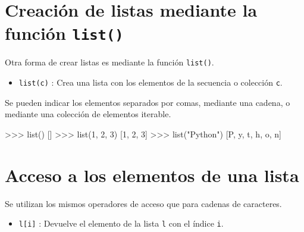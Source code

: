 \documentclass[
  spanish,
  a4paper,
]{scrreport}
\newenvironment{Shaded}{\begin{snugshade}}{\end{snugshade}}
\newcommand{\BuiltInTok}[1]{\textcolor[rgb]{0.00,0.23,0.31}{#1}}
\newcommand{\DecValTok}[1]{\textcolor[rgb]{0.68,0.00,0.00}{#1}}
\newcommand{\NormalTok}[1]{\textcolor[rgb]{0.00,0.23,0.31}{#1}}
\newcommand{\OperatorTok}[1]{\textcolor[rgb]{0.37,0.37,0.37}{#1}}
\newcommand{\StringTok}[1]{\textcolor[rgb]{0.13,0.47,0.30}{#1}}
\providecommand{\tightlist}{%
  \setlength{\itemsep}{0pt}\setlength{\parskip}{0pt}}
\begin{document}
\section{\texorpdfstring{Creación de listas mediante la función
\texttt{list()}}{Creación de listas mediante la función list()}}\label{creaciuxf3n-de-listas-mediante-la-funciuxf3n-list}

Otra forma de crear listas es mediante la función \texttt{list()}.

\begin{itemize}
\tightlist
\item
  \texttt{list(c)} : Crea una lista con los elementos de la secuencia o
  colección \texttt{c}.
\end{itemize}

Se pueden indicar los elementos separados por comas, mediante una
cadena, o mediante una colección de elementos iterable.

\begin{Shaded}
\begin{Highlighting}[]
\OperatorTok{\textgreater{}\textgreater{}\textgreater{}} \BuiltInTok{list}\NormalTok{()}
\NormalTok{[]}
\OperatorTok{\textgreater{}\textgreater{}\textgreater{}} \BuiltInTok{list}\NormalTok{(}\DecValTok{1}\NormalTok{, }\DecValTok{2}\NormalTok{, }\DecValTok{3}\NormalTok{)}
\NormalTok{[}\DecValTok{1}\NormalTok{, }\DecValTok{2}\NormalTok{, }\DecValTok{3}\NormalTok{]}
\OperatorTok{\textgreater{}\textgreater{}\textgreater{}} \BuiltInTok{list}\NormalTok{(}\StringTok{"Python"}\NormalTok{)}
\NormalTok{[}\StringTok{\textquotesingle{}P\textquotesingle{}}\NormalTok{, }\StringTok{\textquotesingle{}y\textquotesingle{}}\NormalTok{, }\StringTok{\textquotesingle{}t\textquotesingle{}}\NormalTok{, }\StringTok{\textquotesingle{}h\textquotesingle{}}\NormalTok{, }\StringTok{\textquotesingle{}o\textquotesingle{}}\NormalTok{, }\StringTok{\textquotesingle{}n\textquotesingle{}}\NormalTok{]}
\end{Highlighting}
\end{Shaded}

\section{Acceso a los elementos de una
lista}\label{acceso-a-los-elementos-de-una-lista}

Se utilizan los mismos operadores de acceso que para cadenas de
caracteres.

\begin{itemize}
\tightlist
\item
  \texttt{l{[}i{]}} : Devuelve el elemento de la lista \texttt{l} con el
  índice \texttt{i}.
\end{itemize}
\end{document}
